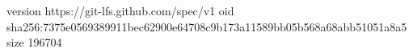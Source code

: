 version https://git-lfs.github.com/spec/v1
oid sha256:7375e0569389911bec62900e64708c9b173a11589bb05b568a68abb51051a8a5
size 196704
